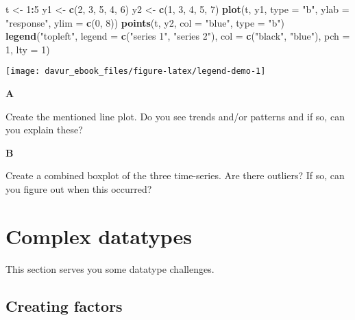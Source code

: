 \documentclass[]{book}
\newenvironment{Shaded}{\begin{snugshade}}{\end{snugshade}}
\newcommand{\DataTypeTok}[1]{\textcolor[rgb]{0.13,0.29,0.53}{#1}}
\newcommand{\DecValTok}[1]{\textcolor[rgb]{0.00,0.00,0.81}{#1}}
\newcommand{\KeywordTok}[1]{\textcolor[rgb]{0.13,0.29,0.53}{\textbf{#1}}}
\newcommand{\NormalTok}[1]{#1}
\newcommand{\OperatorTok}[1]{\textcolor[rgb]{0.81,0.36,0.00}{\textbf{#1}}}
\newcommand{\StringTok}[1]{\textcolor[rgb]{0.31,0.60,0.02}{#1}}
\begin{document}
\begin{Shaded}
\begin{Highlighting}[]
\NormalTok{t <-}\StringTok{ }\DecValTok{1}\OperatorTok{:}\DecValTok{5}
\NormalTok{y1 <-}\StringTok{ }\KeywordTok{c}\NormalTok{(}\DecValTok{2}\NormalTok{, }\DecValTok{3}\NormalTok{, }\DecValTok{5}\NormalTok{, }\DecValTok{4}\NormalTok{, }\DecValTok{6}\NormalTok{)}
\NormalTok{y2 <-}\StringTok{ }\KeywordTok{c}\NormalTok{(}\DecValTok{1}\NormalTok{, }\DecValTok{3}\NormalTok{, }\DecValTok{4}\NormalTok{, }\DecValTok{5}\NormalTok{, }\DecValTok{7}\NormalTok{)}
\KeywordTok{plot}\NormalTok{(t, y1, }\DataTypeTok{type =} \StringTok{"b"}\NormalTok{, }\DataTypeTok{ylab =} \StringTok{"response"}\NormalTok{, }\DataTypeTok{ylim =} \KeywordTok{c}\NormalTok{(}\DecValTok{0}\NormalTok{, }\DecValTok{8}\NormalTok{))}
\KeywordTok{points}\NormalTok{(t, y2, }\DataTypeTok{col =} \StringTok{"blue"}\NormalTok{, }\DataTypeTok{type =} \StringTok{"b"}\NormalTok{)}
\KeywordTok{legend}\NormalTok{(}\StringTok{"topleft"}\NormalTok{, }\DataTypeTok{legend =} \KeywordTok{c}\NormalTok{(}\StringTok{"series 1"}\NormalTok{, }\StringTok{"series 2"}\NormalTok{), }\DataTypeTok{col =} \KeywordTok{c}\NormalTok{(}\StringTok{"black"}\NormalTok{, }\StringTok{"blue"}\NormalTok{), }\DataTypeTok{pch =} \DecValTok{1}\NormalTok{, }\DataTypeTok{lty =} \DecValTok{1}\NormalTok{)}
\end{Highlighting}
\end{Shaded}

\begin{center}\texttt{[image: davur\_ebook\_files/figure-latex/legend-demo-1]} \end{center}

\textbf{A}

Create the mentioned line plot. Do you see trends and/or patterns and if so, can you explain these?

\textbf{B}

Create a combined boxplot of the three time-series. Are there outliers? If so, can you figure out when this occurred?

\hypertarget{complex-datatypes-1}{%
\section{Complex datatypes}\label{complex-datatypes-1}}

This section serves you some datatype challenges.

\hypertarget{creating-factors}{%
\subsection{Creating factors}\label{creating-factors}}
\end{document}
